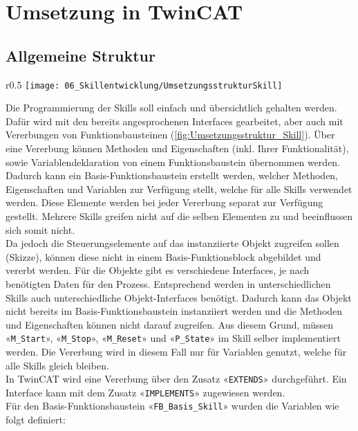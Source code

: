 \section{Umsetzung in TwinCAT} \label{Skillumsetzung in TwinCAT}

	\subsection{Allgemeine Struktur} \label{Skill_Allgemeine Struktur}
		 \begin{wrapfigure}{r}{0.5\textwidth}
			\centering
			\texttt{[image: 06\_Skillentwicklung/UmsetzungsstrukturSkill]}
			\captionsetup{justification=centering}
			\caption{Umsetzungsstruktur}
			\label{fig:Umsetzungsstruktur_Skill}
		\end{wrapfigure} \par
		Die Programmierung der Skills soll einfach und übersichtlich gehalten werden. Dafür wird mit den bereits angesprochenen Interfaces gearbeitet, aber auch mit Vererbungen von Funktionsbausteinen (\ref{fig:Umsetzungsstruktur_Skill}). Über eine Vererbung können Methoden und Eigenschaften (inkl. Ihrer Funktionalität), sowie Variablendeklaration von einem Funktionsbaustein übernommen werden. Dadurch kann ein Basis-Funktionsbaustein erstellt werden, welcher Methoden, Eigenschaften und Variablen zur Verfügung stellt, welche für alle Skills verwendet werden. Diese Elemente werden bei jeder Vererbung separat zur Verfügung gestellt. Mehrere Skills greifen nicht auf die selben Elementen zu und beeinflussen sich somit nicht. 
		\\
		Da jedoch die Steuerungselemente auf das instanziierte Objekt zugreifen sollen (Skizze), können diese nicht in einem Basis-Funktionsblock abgebildet und vererbt werden. Für die Objekte gibt es verschiedene Interfaces, je nach benötigten Daten für den Prozess. Entsprechend werden in unterschiedlichen Skills auch unterschiedliche Objekt-Interfaces benötigt. Dadurch kann das Objekt nicht bereits im Basis-Funktionsbaustein instanziiert werden und die Methoden und Eigenschaften können nicht darauf zugreifen. Aus diesem Grund, müssen «\verb|M_Start|», «\verb|M_Stop|», «\verb|M_Reset|» und «\verb|P_State|» im Skill selber implementiert werden. Die Vererbung wird in diesem Fall nur für Variablen genutzt, welche für alle Skills gleich bleiben.
		\\
		In TwinCAT wird eine Vererbung über den Zusatz «\verb|EXTENDS|» durchgeführt. Ein Interface kann mit dem Zusatz «\verb|IMPLEMENTS|» zugewiesen werden. 
		\\
		Für den Basis-Funktionsbaustein «\verb|FB_Basis_Skill|» wurden die Variablen wie folgt definiert: 
		
